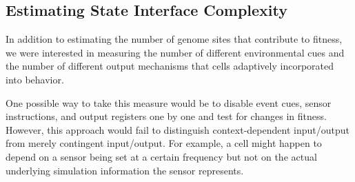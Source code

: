 



\subsection{Estimating State Interface Complexity}

In addition to estimating the number of genome sites that contribute to fitness, we were interested in measuring the number of different environmental cues and the number of different output mechanisms that cells adaptively incorporated into behavior.

One possible way to take this measure would be to disable event cues, sensor instructions, and output registers one by one and test for changes in fitness.
However, this approach would fail to distinguish context-dependent input/output from merely contingent input/output.
For example, a cell might happen to depend on a sensor being set at a certain frequency but not on the actual underlying simulation information the sensor represents.

